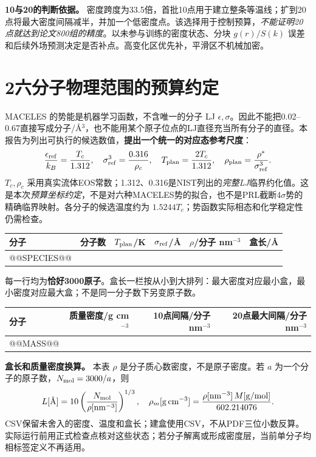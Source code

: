 \documentclass[a4paper]{ctexart}
\begin{document}
\textbf{10与20的判断依据。} 密度跨度为33.5倍，首批10点用于建立整条等温线；扩到20点将最大密度间隔减半，并加一个低密度点。该选择用于控制预算，\emph{不能证明20点就达到论文800组的精度}。以未参与训练的密度状态、分块 $g(r)/S(k)$ 误差和后续外场预测决定是否补点。高变化区优先补，平滑区不机械加密。

\clearpage
\section*{2\quad 六分子物理范围的预算约定}
MACELES 的势能是机器学习函数，不含唯一的分子 LJ $\epsilon,\sigma$。因此不能把0.02--0.67直接写成分子/\AA$^3$，也不能用某个原子位点的LJ直径充当所有分子的直径。本报告为列出可执行的候选数值，\textbf{提出一个统一的对应态参考尺度}：
\[
\frac{\epsilon_{\rm ref}}{k_B}=\frac{T_c}{1.312},\quad
\sigma_{\rm ref}^3=\frac{0.316}{\rho_c},\quad
T_{\rm plan}=\frac{2T_c}{1.312},\quad
\rho_{\rm plan}=\frac{\rho^*}{\sigma_{\rm ref}^3}.
\]
$T_c,\rho_c$ 采用真实流体EOS常数；1.312、0.316是NIST列出的\emph{完整LJ}临界约化值。这是本次\emph{预算坐标约定}，不是对六种MACELES势的拟合，也不是PRL截断4$\sigma$势的精确临界映射。各分子的候选温度约为 $1.5244T_c$；势函数实际相态和化学稳定性仍需检查。

\begin{center}\small
\begin{tabular}{lrrrrr}\toprule
分子 & 分子数 & $T_{\rm plan}$/K & $\sigma_{\rm ref}$/\AA & $\rho$/分子 nm$^{-3}$ & 盒长/\AA\\\midrule
@@SPECIES@@
\bottomrule\end{tabular}\end{center}
每一行均为\textbf{恰好3000原子}。盒长一栏按从小到大排列：最大密度对应最小盒，最小密度对应最大盒；不是同一分子数下另变原子数。

\begin{center}\small
\begin{tabular}{lrrr}\toprule
分子 & 质量密度/g cm$^{-3}$ & 10点间隔/分子 nm$^{-3}$ & 20点最大间隔/分子 nm$^{-3}$\\\midrule
@@MASS@@
\bottomrule\end{tabular}\end{center}

\textbf{盒长和质量密度换算。} 本表 $\rho$ 是分子质心数密度，不是原子密度。若 $a$ 为一个分子的原子数，$N_{\rm mol}=3000/a$，则
\[
L[\text{\AA}]=10\left(\frac{N_{\rm mol}}{\rho[\mathrm{nm}^{-3}]}\right)^{1/3},\quad
\rho_m[\mathrm{g\,cm}^{-3}]=\frac{\rho[\mathrm{nm}^{-3}]\,M[\mathrm{g/mol}]}{602.214076}.
\]
CSV保留未舍入的密度、温度和盒长；建盒使用CSV，不从PDF三位小数反算。实际运行前用正式检查点核对这些状态；若分子解离或形成密度层，当前单分子均相标签定义不再适用。
\end{document}
